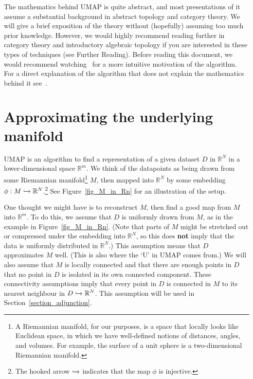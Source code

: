 \documentclass[a4paper,11pt,leqno]{article}
\newcommand{\inj}{\xhookrightarrow{}}
\newcommand{\RR}{\mathbb{R}}
\theoremstyle{definition}
\begin{document}
The mathematics behind UMAP is quite abstract, and most presentations of it assume a substantial background in abstract topology and category theory.
We will give a brief exposition of the theory without (hopefully) assuming too much prior knowledge.
However, we would highly recommend reading further in category theory and introductory algebraic topology if you are interested in these types of techniques (see Further Reading).
Before reading this document, we would recommend watching~\cite{McInnesVideo} for a more intuitive motivation of the algorithm.
For a direct explanation of the algorithm that does not explain the mathematics behind it see~\cite[Section 3]{McInnes18}.

\section{Approximating the underlying manifold}
\label{section_uniform}

UMAP is an algorithm to find a representation of a given dataset $D$ in $\RR^N$ in a lower-dimensional space $\RR^m$.
We think of the datapoints as being drawn from some Riemannian manifold\footnote{
A Riemannian manifold, for our purposes, is a space that locally looks like Euclidean space, in which we have well-defined notions of distances, angles, and volumes. For example, the surface of a unit sphere is a two-dimensional Riemannian manifold.
}
 $M$, then mapped into $\RR^N$ by some embedding $\phi: M\inj \RR^N$.\footnote{
The hooked arrow $\inj$ indicates that the map $\phi$ is injective.
 }
See Figure~\ref{fig_M_in_Rn} for an illustration of the setup.

One thought we might have is to reconstruct $M$, then find a good map from $M$ into $\RR^m$.
To do this, we assume that $D$ is uniformly drawn from $M$, as in the example in Figure~\ref{fig_M_in_Rn}. (Note that parts of $M$ might be stretched out or compressed under the embedding into $\RR^N$, so this does {\textbf{not}} imply that the data is uniformly distributed in $\RR^N$.)
This assumption means that $D$ approximates $M$ well.
(This is also where the `U' in UMAP comes from.)
We will also assume that $M$ is locally connected and that there are enough points in $D$ that no point in $D$ is isolated in its own connected component.
These connectivity assumptions imply that every point in $D$ is connected in $M$ to its nearest neighbour in $D\inj \RR^N$.
This assumption will be used in Section~\ref{section_adjunction}.
\end{document}
